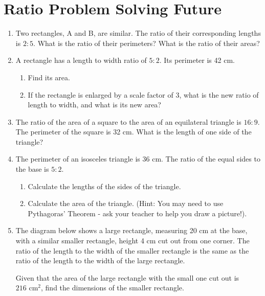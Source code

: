 \documentclass[12pt,a4paper]{article}
\begin{document}
\section*{Ratio Problem Solving Future}
\begin{enumerate}[start=26]

    \item Two rectangles, A and B, are similar. The ratio of their corresponding lengths is $2:5$. What is the ratio of their perimeters? What is the ratio of their areas?

    \item A rectangle has a length to width ratio of $5:2$. Its perimeter is 42 cm.
    \begin{enumerate}[label=(\alph*)]
        \item Find its area.
        \item If the rectangle is enlarged by a scale factor of 3, what is the new ratio of length to width, and what is its new area?
    \end{enumerate}

    \item The ratio of the area of a square to the area of an equilateral triangle is $16:9$. The perimeter of the square is 32 cm. What is the length of one side of the triangle?

    \item The perimeter of an isosceles triangle is 36 cm. The ratio of the equal sides to the base is $5:2$.
    \begin{enumerate}[label=(\alph*)]
        \item Calculate the lengths of the sides of the triangle.
        \item Calculate the area of the triangle. (Hint: You may need to use Pythagoras' Theorem - ask your teacher to help you draw a picture!).
    \end{enumerate}

    \item The diagram below shows a large rectangle, measuring 20 cm at the base, with a similar smaller rectangle, height 4 cm cut out from one corner. The ratio of the length to the width of the smaller rectangle is the same as the ratio of the length to the width of the large rectangle.
    
    \begin{center}
    \end{center}
    
    Given that the area of the large rectangle with the small one cut out is $216 \text{ cm}^2$, find the dimensions of the smaller rectangle.

\end{enumerate}
\end{document}
